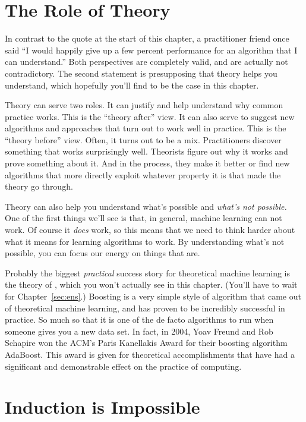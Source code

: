 \section{The Role of Theory}

In contrast to the quote at the start of this chapter, a practitioner
friend once said ``I would happily give up a few percent performance
for an algorithm that I can understand.''  Both perspectives are
completely valid, and are actually not contradictory.  The second
statement is presupposing that theory helps you understand, which
hopefully you'll find to be the case in this chapter.

Theory can serve two roles.  It can justify and help understand why
common practice works.  This is the ``theory after'' view.  It can
also serve to suggest new algorithms and approaches that turn out to
work well in practice.  This is the ``theory before'' view.  Often, it
turns out to be a mix.  Practitioners discover something that works
surprisingly well.  Theorists figure out why it works and prove
something about it.  And in the process, they make it better or find
new algorithms that more directly exploit whatever property it is that
made the theory go through.

Theory can also help you understand what's possible and \emph{what's
  not possible.}  One of the first things we'll see is that, in
general, machine learning can not work.  Of course it \emph{does}
work, so this means that we need to think harder about what it means
for learning algorithms to work.  By understanding what's not
possible, you can focus our energy on things that are.

Probably the biggest \emph{practical} success story for theoretical
machine learning is the theory of , which you won't
actually see in this chapter.  (You'll have to wait for
Chapter~\ref{sec:ens}.)  Boosting is a very simple style of algorithm
that came out of theoretical machine learning, and has proven to be
incredibly successful in practice.  So much so that it is one of the
de facto algorithms to run when someone gives you a new data set.  In
fact, in 2004, Yoav Freund and Rob Schapire won the ACM's Paris
Kanellakis Award for their boosting algorithm AdaBoost.  This award is
given for theoretical accomplishments that have had a significant and
demonstrable effect on the practice of computing.

\section{Induction is Impossible}


